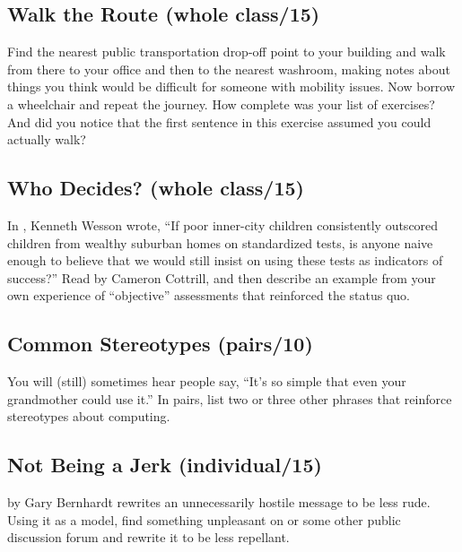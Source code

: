 \subsection*{Walk the Route (whole class/15)}

Find the nearest public transportation drop-off point to your building
and walk from there to your office and then to the nearest washroom,
making notes about things you think would be difficult for someone with
mobility issues. Now borrow a wheelchair and repeat the journey. How
complete was your list of exercises? And did you notice that the first
sentence in this exercise assumed you could actually walk?

\subsection*{Who Decides? (whole class/15)}

In \cite{Litt2004}, Kenneth Wesson wrote, ``If poor inner-city
children consistently outscored children from wealthy suburban homes
on standardized tests, is anyone naive enough to believe that we would
still insist on using these tests as indicators of success?'' Read
 by Cameron Cottrill, and then
describe an example from your own experience of ``objective''
assessments that reinforced the status quo.

\subsection*{Common Stereotypes (pairs/10)}

You will (still) sometimes hear people say, ``It's so simple that even
your grandmother could use it.'' In pairs, list two or three other
phrases that reinforce stereotypes about computing.

\subsection*{Not Being a Jerk (individual/15)}

 by Gary Bernhardt rewrites an
unnecessarily hostile message to be less rude. Using it as a model,
find something unpleasant on  or some
other public discussion forum and rewrite it to be less repellant.

